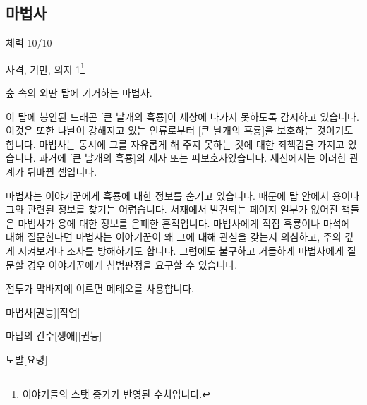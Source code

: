 \documentclass{report}
\begin{document}
	\subsection*{마법사}
		체력 10/10
		
		사격, 기만, 의지 1\footnote{이야기들의 스탯 증가가 반영된 수치입니다.}
		
		숲 속의 외딴 탑에 기거하는 마법사.

		이 탑에 봉인된 드래곤 [큰 날개의 흑룡]이 세상에 나가지 못하도록 감시하고 있습니다. 이것은 또한 나날이 강해지고 있는 인류로부터 [큰 날개의 흑룡]을 보호하는 것이기도 합니다. 마법사는 동시에 그를 자유롭게 해 주지 못하는 것에 대한 죄책감을 가지고 있습니다. 과거에 [큰 날개의 흑룡]의 제자 또는 피보호자였습니다. 세션에서는 이러한 관계가 뒤바뀐 셈입니다.
		
		마법사는 이야기꾼에게 흑룡에 대한 정보를 숨기고 있습니다. 때문에 탑 안에서 용이나 그와 관련된 정보를 찾기는 어렵습니다. 서재에서 발견되는 페이지 일부가 없어진 책들은 마법사가 용에 대한 정보를 은폐한 흔적입니다. 마법사에게 직접 흑룡이나 마석에 대해 질문한다면 마법사는 이야기꾼이 왜 그에 대해 관심을 갖는지 의심하고, 주의 깊게 지켜보거나 조사를 방해하기도 합니다. 그럼에도 불구하고 거듭하게 마법사에게 질문할 경우 이야기꾼에게 침범판정을 요구할 수 있습니다.
		
		전투가 막바지에 이르면 메테오를 사용합니다.
	
		\begin{story}{마법사}{[권능][직업]}
			
			
		\end{story}
		
		\begin{story}{마탑의 간수}{[생애][권능]}
			
		\end{story}
		
		\begin{story}{도발}{[요령]}
		\end{story}
		
\end{document}
